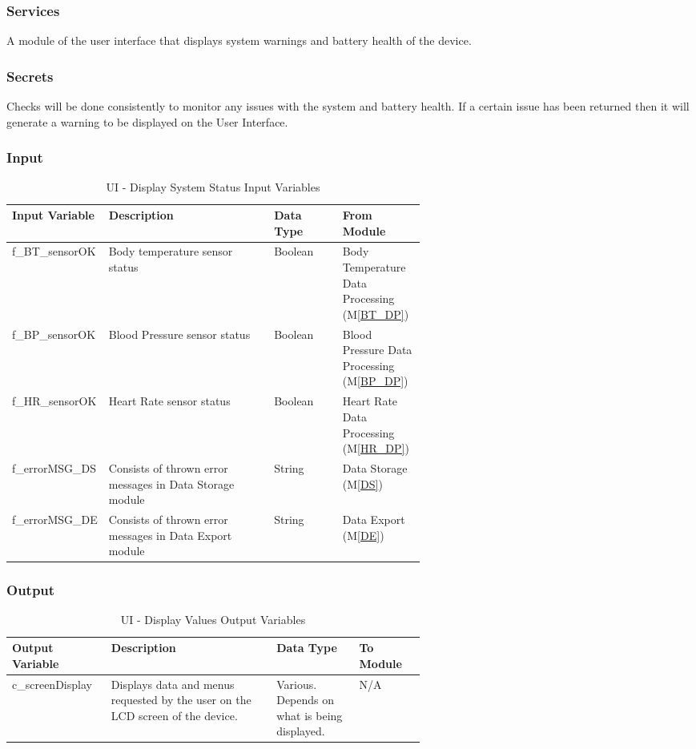 \documentclass{article}
\begin{document}
\begin{description}
    
        \subsubsection{Services}
        A module of the user interface that displays system warnings and battery health of the device.
        \subsubsection{Secrets}
        Checks will be done consistently to monitor any issues with the system and battery health. If a certain issue has been returned then it will generate a warning to be displayed on the User Interface.
        \newpage
        \subsubsection{Input}
            \begin{longtable}{|l|p{0.4\linewidth}|l|p{0.2\linewidth}|}
            \caption{UI - Display System Status Input Variables}
            \hline
            \textbf{Input Variable} & \textbf{Description} & \textbf {Data Type} & \textbf{From Module} \\
            \endhead
            \hline
            f\_BT\_sensorOK   & Body temperature sensor status  & Boolean & Body Temperature Data Processing (M\ref{BT_DP})\\
            \hline
            f\_BP\_sensorOK   & Blood Pressure sensor status  & Boolean & Blood Pressure Data Processing (M\ref{BP_DP}) \\
            \hline
            f\_HR\_sensorOK   & Heart Rate sensor status & Boolean & Heart Rate Data Processing (M\ref{HR_DP}) \\
            \hline
            f\_errorMSG\_DS   & Consists of thrown error messages in Data Storage module & String & Data Storage (M\ref{DS})\\
            \hline
            f\_errorMSG\_DE   & Consists of thrown error messages in Data Export module & String & Data Export (M\ref{DE})\\
            \hline
            \end{longtable}
        \subsubsection{Output}
            \begin{longtable}{|l|p{0.4\linewidth}|p{0.2\linewidth}|l|}
           \caption{UI - Display Values Output Variables}
            \hline
            \textbf{Output Variable} & \textbf{Description} & \textbf {Data Type} & \textbf{To Module} \\
            \endhead
            \hline
            c\_screenDisplay   & Displays data and menus requested by the user on the LCD screen of the device. & Various. Depends on what is being displayed. & N/A \\
            \hline
            \end{longtable}

\end{description}
\end{document}

